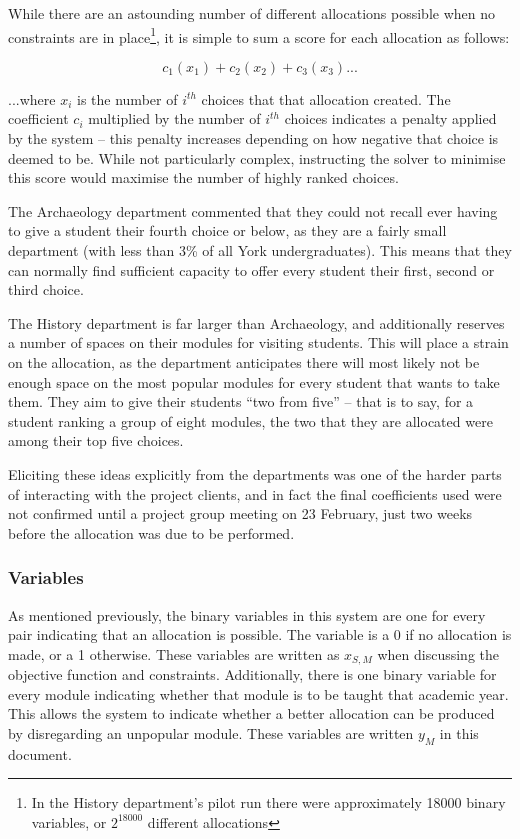 While there are an astounding number of different allocations possible when no
constraints are in place\footnote{In the History department's pilot run there
were approximately 18000 binary variables, or $2^{18000}$ different
allocations}, it is simple to sum a score for each allocation as follows:

$$
c_1(x_1) + c_2(x_2) + c_3(x_3) ...
$$

...where $x_i$ is the number of $i^{th}$ choices that that allocation created.
The coefficient $c_i$ multiplied by the number of $i^{th}$ choices indicates a
penalty applied by the system -- this penalty increases depending on how
negative that choice is deemed to be. While not particularly complex,
instructing the solver to minimise this score would maximise the number of
highly ranked choices.

The Archaeology department commented that they could not recall ever having to
give a student their fourth choice or below, as they are a fairly small
department (with less than 3\% of all York undergraduates). This means that
they can normally find sufficient capacity to offer every student their first,
second or third choice.

The History department is far larger than Archaeology, and additionally
reserves a number of spaces on their modules for visiting students. This will
place a strain on the allocation, as the department anticipates there will
most likely not be enough space on the most popular modules for every student
that wants to take them. They aim to give their students ``two from five'' --
that is to say, for a student ranking a group of eight modules, the two that
they are allocated were among their top five choices.

Eliciting these ideas explicitly from the departments was one of the harder
parts of interacting with the project clients, and in fact the final
coefficients used were not confirmed until a project group meeting on 23
February, just two weeks before the allocation was due to be performed.

\subsubsection{Variables}

As mentioned previously, the binary variables in this system are one for every
\studmod pair indicating that an allocation is possible. The variable is a 0
if no allocation is made, or a 1 otherwise. These variables are written as
$x_{S,M}$ when discussing the objective function and constraints.
Additionally, there is one binary variable for every module indicating whether
that module is to be taught that academic year. This allows the system to
indicate whether a better allocation can be produced by disregarding an
unpopular module. These variables are written $y_{M}$ in this document.

